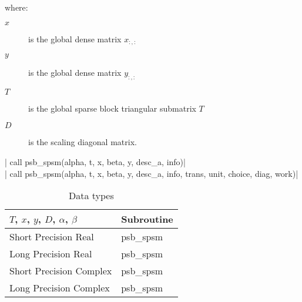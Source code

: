 where:
\begin{description}
\item[$x$] is the global dense matrix $x_{:, :}$
\item[$y$] is the global dense matrix $y_{:, :}$
\item[$T$] is the global sparse block triangular submatrix $T$
\item[$D$] is the scaling diagonal matrix.
\end{description}

\fortinline| call psb_spsm(alpha, t, x, beta, y, desc_a, info)|\\
\fortinline| call psb_spsm(alpha, t, x, beta, y, desc_a, info, trans, unit, choice, diag, work)|\\

\begin{table}[h]
\begin{center}
\begin{tabular}{ll}
\hline
$T$, $x$, $y$, $D$, $\alpha$, $\beta$ & {\bf Subroutine}\\
\hline
Short Precision Real & psb\_spsm \\
Long Precision Real & psb\_spsm \\
Short Precision Complex & psb\_spsm \\
Long Precision Complex & psb\_spsm \\
\hline
\end{tabular}
\end{center}
\caption{Data types\label{tab:f90spsm}}
\end{table}



